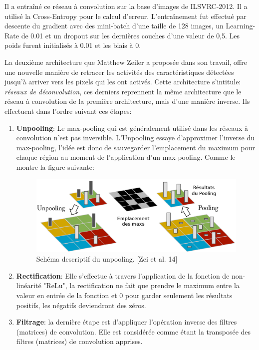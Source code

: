 	Il a entraîné ce réseau à convolution sur la base d'images de ILSVRC-2012. Il a utilisé la Cross-Entropy pour le calcul d'erreur. L’entraînement fut effectué par descente du gradient avec des mini-batch d'une taille de 128 images, un Learning-Rate de 0.01 et un dropout sur les dernières couches d'une valeur de 0,5. Les poids furent initialisés à 0.01 et les biais à 0.

	La deuxième architecture que Matthew Zeiler a proposée dans son travail, offre une nouvelle manière de retracer les activités des caractéristiques détectées jusqu'à arriver vers les pixels qui les ont activés. Cette architecture s'intitule: \textit{réseaux de déconvolution}, ces derniers reprennent la même architecture que le réseau à convolution de la première architecture, mais d'une manière inverse. Ils effectuent dans l'ordre suivant ces étapes:

\begin{enumerate}
\item \textbf{Unpooling}: Le max-pooling qui est généralement utilisé dans les réseaux à convolution n'est pas inversible. L'Unpooling essaye d'approximer l'inverse du max-pooling, l’idée est donc de sauvegarder l'emplacement du maximum pour chaque région au moment de l'application d'un max-pooling. Comme le montre la figure suivante:

\begin{figure}[H]
	\centering
		\includegraphics[width=5in]{Figures/unpooling.png}
	\caption[Res]{Schéma descriptif du unpooling. [Zei et al. 14]}
	\label{fig:Electron}
\end{figure}

\item \textbf{Rectification}: Elle s'effectue à travers l'application de la fonction de non-linéarité "ReLu", la rectification ne fait que prendre le maximum entre la valeur en entrée de la fonction et 0 pour garder seulement les résultats positifs, les négatifs deviendront des zéros.

\item \textbf{Filtrage}: la dernière étape est d'appliquer l'opération inverse des filtres (matrices) de convolution. Elle est considérée comme étant la transposée des filtres (matrices) de convolution apprises.
\end{enumerate}


